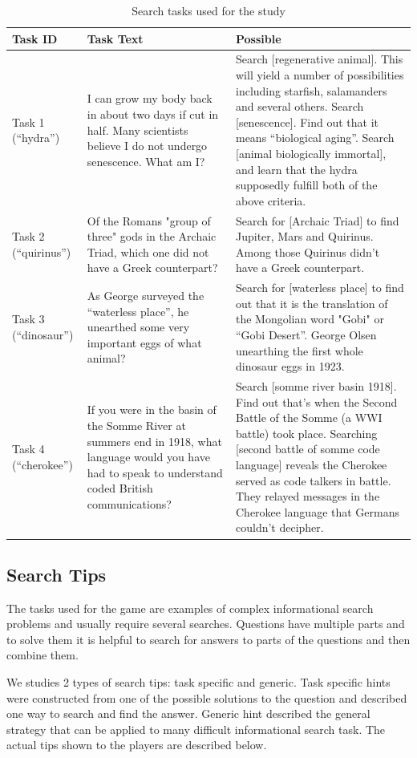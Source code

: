 \documentclass{sig-alternate}
\begin{document}
\begin{table}
\centering
\caption{Search tasks used for the study}
\label{table:tasks}
\begin{tabular}{|l|p{6cm}|p{8cm}|} \hline
Task ID & Task Text & Possible \\ \hline
Task 1 (``hydra'') & I can grow my body back in about two days if cut in half. Many scientists believe I do not undergo senescence. What am I? & Search [regenerative animal]. This will yield a number of possibilities including starfish, salamanders and several others. Search [senescence]. Find out that it means ``biological aging''. Search [animal biologically immortal], and learn that the hydra supposedly fulfill both of the above criteria. \\ \hline
Task 2 (``quirinus'') & Of the Romans "group of three" gods in the Archaic Triad, which one did not have a Greek counterpart? & Search for [Archaic Triad] to find Jupiter, Mars and Quirinus. Among those Quirinus didn't have a Greek counterpart.\\ \hline
Task 3 (``dinosaur'') & As George surveyed the ``waterless place'', he unearthed some very important eggs of what animal? & Search for [waterless place] to find out that it is the translation of the Mongolian word "Gobi" or ``Gobi Desert''. George Olsen unearthing the first whole dinosaur eggs in 1923. \\ \hline
Task 4 (``cherokee'') & If you were in the basin of the Somme River at summers end in 1918, what language would you have had to speak to understand coded British communications? & Search [somme river basin 1918]. Find out that's when the Second Battle of the Somme (a WWI battle) took place. Searching [second battle of somme code language] reveals the Cherokee served as code talkers in battle. They relayed messages in the Cherokee language that Germans couldn't decipher. \\ \hline
\end{tabular}
\end{table}

\subsection{Search Tips}
The tasks used for the game are examples of complex informational search problems and usually require several searches. Questions have multiple parts and to solve them it is helpful to search for answers to parts of the questions and then combine them.

We studies 2 types of search tips: task specific and generic. Task specific hints were constructed from one of the possible solutions to the question and described one way to search and find the answer. Generic hint described the general strategy that can be applied to many difficult informational search task.
The actual tips shown to the players are described below.
\end{document}
